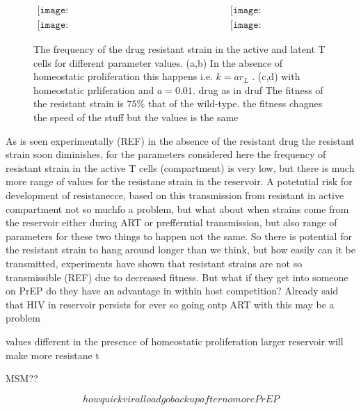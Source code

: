 \documentclass[DIV=15]{scrartcl}
\begin{document}
\begin{figure*}[h]
 \begin{center}$
 \begin{array}{cc}
 \texttt{[image: NoHomeo\_Active\_S1\_HigFit075\_09\_06b.png]} &
 \texttt{[image: NoHomeo\_Reservoir\_S1\_HigFit075\_09\_06b.png]} \\
  \texttt{[image: Homeo\_Active\_S1\_HigFit075\_09\_06b.png]} &
 \texttt{[image: Homeo\_Reservoir\_S1\_HigFit075\_09\_06b.png]}
 \end{array}$
 \end{center}
 \caption{The frequency of the drug resistant strain in the active and latent T cells for different parameter values. (a,b) In the absence of homeostatic proliferation this happens i.e. $k = ar_L$ . (c,d) with homeostatic prliferation and $a = 0.01$.  drug as in druf 
 The fitness of the resistant strain is $75\%$ that of the wild-type. the fitness chagnes  the speed  of the stuff but the values is the same  }
 \label{within host parameter sweep}
 \end{figure*} 

As is seen experimentally (REF) in the absence of the resistant drug the resistant strain soon diminishes,  for the parameters considered here the frequency of resistant strain in the active T cells (compartment) is very low, but there is much more range of values for the resistane strain in the reservoir. A potetntial risk for development 
of resistanecce, based on this transmission from resistant in active compartment not so muchfo a problem,  but what about when strains come from the reservoir either during ART or prefferntial transmission, but also  range of parameters for these two things to happen not the same. So there is potential for the resistant strain to hang around longer than we think, but how easily can it be transmitted, experiments have shown that resistant strains are not so transmissible (REF) due to decreased fitness.  But what if they get into someone on PrEP do they have an advantage in within host competition? Already said that HIV in reservoir persists for ever so going ontp ART with this may be a problem

values different in the presence of  homeostatic proliferation larger reservoir will make more resistane t


MSM??




$$how quick viral load go back up after no more PrEP$$
\end{document}
